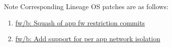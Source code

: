 \begin{tip}{Note}
    Corresponding Lineage OS patches are as follows:
    \begin{enumerate}
        \item \href{https://github.com/LineageOS/android\_frameworks\_base/commit/a04932bafbbf7d99efd18276152cc2c9c9b2073e}{fw/b: Squash of app fw restriction commits}
        \item \href{https://github.com/LineageOS/android\_frameworks\_base/commit/02c8c82854348f52afe2199f310f44b5f578b5b8}{fw/b: Add support for per app network isolation}
    \end{enumerate}
\end{tip}
